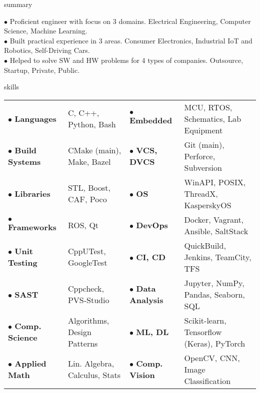 \documentclass{template}
\begin{document}
\begin{rSection}{summary}

$\bullet$ Proficient engineer with focus on 3 domains. Electrical Engineering, Computer Science, Machine Learning. \\
$\bullet$ Built practical experience in 3 areas. Consumer Electronics, Industrial IoT and Robotics, Self-Driving Cars. \\
$\bullet$ Helped to solve SW and HW problems for 4 types of companies. Outsource, Startup, Private, Public.

\end{rSection}

\begin{rSection}{skills}
\begin{tabular}{llll}

$\bullet$ \textbf{Languages}     & C, C++, Python, Bash          & $\bullet$ \textbf{Embedded}      & MCU, RTOS, Schematics, Lab Equipment \\
$\bullet$ \textbf{Build Systems} & CMake (main), Make, Bazel     & $\bullet$ \textbf{VCS, DVCS}     & Git (main), Perforce, Subversion \\
$\bullet$ \textbf{Libraries}     & STL, Boost, CAF, Poco         & $\bullet$ \textbf{OS}            & WinAPI, POSIX, ThreadX, KasperskyOS \\
$\bullet$ \textbf{Frameworks}    & ROS, Qt                       & $\bullet$ \textbf{DevOps}        & Docker, Vagrant, Ansible, SaltStack  \\
$\bullet$ \textbf{Unit Testing}  & CppUTest, GoogleTest          & $\bullet$ \textbf{CI, CD}        & QuickBuild, Jenkins, TeamCity, TFS \\
$\bullet$ \textbf{SAST}          & Cppcheck, PVS‑Studio          & $\bullet$ \textbf{Data Analysis} & Jupyter, NumPy, Pandas, Seaborn, SQL \\
$\bullet$ \textbf{Comp. Science} & Algorithms, Design Patterns   & $\bullet$ \textbf{ML, DL}        & Scikit-learn, Tensorflow (Keras), PyTorch \\
$\bullet$ \textbf{Applied Math}  & Lin. Algebra, Calculus, Stats & $\bullet$ \textbf{Comp. Vision}  & OpenCV, CNN, Image Classification \\

\end{tabular}
\end{rSection}
\end{document}
